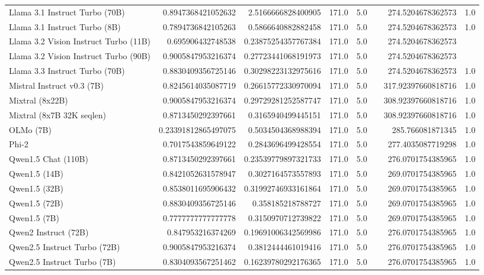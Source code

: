 \begin{table}[htp]
{\begin{tabular}{lrrrrrrr}
Llama 3.1 Instruct Turbo (70B) & 0.8947368421052632 & 2.5166666828400905 & 171.0 & 5.0 &  & 274.5204678362573 & 1.0 \\
Llama 3.1 Instruct Turbo (8B) & 0.7894736842105263 & 0.5866640882882458 & 171.0 & 5.0 &  & 274.5204678362573 & 1.0 \\
Llama 3.2 Vision Instruct Turbo (11B) & 0.695906432748538 & 0.23875254357767384 & 171.0 & 5.0 &  & 274.5204678362573 &  \\
Llama 3.2 Vision Instruct Turbo (90B) & 0.9005847953216374 & 0.27723441068191973 & 171.0 & 5.0 &  & 274.5204678362573 &  \\
Llama 3.3 Instruct Turbo (70B) & 0.8830409356725146 & 0.30298223132975616 & 171.0 & 5.0 &  & 274.5204678362573 & 1.0 \\
Mistral Instruct v0.3 (7B) & 0.8245614035087719 & 0.26615772330970094 & 171.0 & 5.0 &  & 317.92397660818716 & 1.0 \\
Mixtral (8x22B) & 0.9005847953216374 & 0.29729281252587747 & 171.0 & 5.0 &  & 308.92397660818716 & 1.0 \\
Mixtral (8x7B 32K seqlen) & 0.8713450292397661 & 0.3165940499445151 & 171.0 & 5.0 &  & 308.92397660818716 & 1.0 \\
OLMo (7B) & 0.23391812865497075 & 0.5034504368988394 & 171.0 & 5.0 &  & 285.766081871345 & 1.0 \\
Phi-2 & 0.7017543859649122 & 0.2843696499428554 & 171.0 & 5.0 &  & 277.4035087719298 & 1.0 \\
Qwen1.5 Chat (110B) & 0.8713450292397661 & 0.23539779897321733 & 171.0 & 5.0 &  & 276.0701754385965 & 1.0 \\
Qwen1.5 (14B) & 0.8421052631578947 & 0.3027164573557893 & 171.0 & 5.0 &  & 269.0701754385965 & 1.0 \\
Qwen1.5 (32B) & 0.8538011695906432 & 0.31992746933161864 & 171.0 & 5.0 &  & 269.0701754385965 & 1.0 \\
Qwen1.5 (72B) & 0.8830409356725146 & 0.358185218788727 & 171.0 & 5.0 &  & 269.0701754385965 & 1.0 \\
Qwen1.5 (7B) & 0.7777777777777778 & 0.3150970712739822 & 171.0 & 5.0 &  & 269.0701754385965 & 1.0 \\
Qwen2 Instruct (72B) & 0.847953216374269 & 0.19691006342569986 & 171.0 & 5.0 &  & 276.0701754385965 & 1.0 \\
Qwen2.5 Instruct Turbo (72B) & 0.9005847953216374 & 0.3812444461019416 & 171.0 & 5.0 &  & 276.0701754385965 & 1.0 \\
Qwen2.5 Instruct Turbo (7B) & 0.8304093567251462 & 0.16239780292176365 & 171.0 & 5.0 &  & 276.0701754385965 & 1.0 \\

\end{tabular}}
\end{table}
